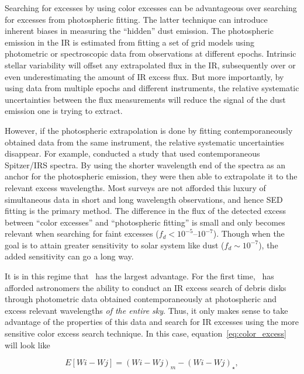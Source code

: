     
    Searching for excesses by using color excesses can be advantageous over searching for excesses from photospheric fitting. The latter technique can introduce inherent biases in measuring the ``hidden'' dust emission. The photospheric emission in the IR is estimated from fitting a set of grid models using photometric or spectroscopic data from observations at different epochs. Intrinsic stellar variability will offset any extrapolated flux in the IR, subsequently over or even underestimating the amount of IR excess flux. But more importantly, by using data from multiple epochs and different instruments, the relative systematic uncertainties between the flux measurements will reduce the signal of the dust emission one is trying to extract.
    
    However, if the photospheric extrapolation is done by fitting contemporaneously obtained data from the same instrument, the relative systematic uncertainties disappear. For example, \citet{Lawler2009} conducted a study that used contemporaneous Spitzer/IRS spectra. By using the shorter wavelength end of the spectra as an anchor for the photospheric emission, they were then able to extrapolate it to the relevant excess wavelengths. Most surveys are not afforded this luxury of simultaneous data in short and long wavelength observations, and hence SED fitting is the primary method. The difference in the flux of the detected excess between ``color excesses'' and ``photospheric fitting'' is small and only becomes relevant when searching for faint excesses ($f_d < 10^{-5}$--$10^{-7}$). Though when the goal is to attain greater sensitivity to solar system like dust ($f_d\sim10^{-7}$), the added sensitivity can go a long way.
    
    It is in this regime that \WS\ has the largest advantage. For the first time, \WS\ has afforded astronomers the ability to conduct an IR excess search of debris disks through photometric data obtained contemporaneously at photospheric and excess relevant wavelengths \textit{of the entire sky}. Thus, it only makes sense to take advantage of the properties of this data and search for IR excesses using the more sensitive color excess search technique. In this case, equation~\ref{eq:color_excess} will look like
    
    \begin{equation}\label{eq:wise_color_excess}
    E\left[Wi - Wj\right] = {\left(Wi - Wj \right)}_m - {\left(Wi- Wj \right)}_\star , 
    \end{equation}
    
